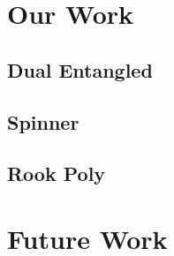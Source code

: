 \documentclass{report}
\begin{document}
\chapter{Our Work}

\section{Dual Entangled}

\section{Spinner}

\section{Rook Poly}

\chapter{Future Work}



\end{document}
